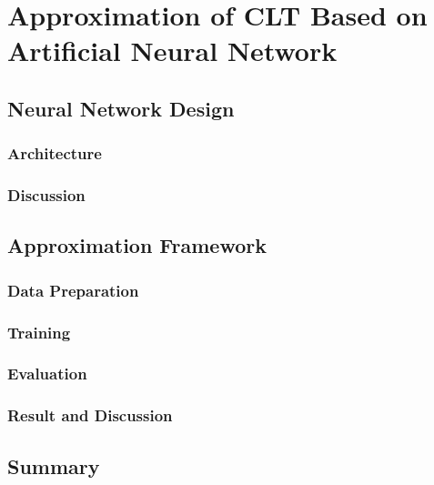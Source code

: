 
\chapter{Approximation of CLT Based on Artificial Neural Network} %

\label{Chapter5} %


\section{Neural Network Design}
\subsection{Architecture}




\subsection{Discussion}
\section{Approximation Framework}
\subsection{Data Preparation}
\subsection{Training}
\subsection{Evaluation}
\subsection{Result and Discussion}
\section{Summary}

